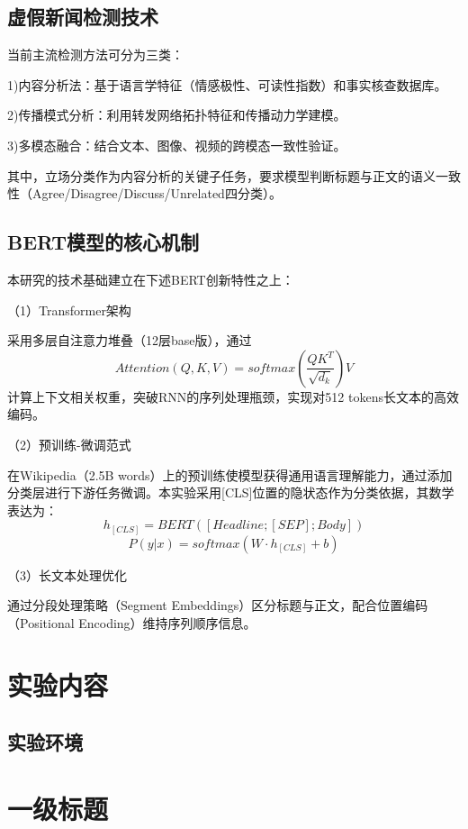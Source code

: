 \documentclass{cjc}
\begin{document}
\subsection{虚假新闻检测技术}

当前主流检测方法可分为三类：

1)内容分析法：基于语言学特征（情感极性、可读性指数）和事实核查数据库。

2)传播模式分析：利用转发网络拓扑特征和传播动力学建模。

3)多模态融合：结合文本、图像、视频的跨模态一致性验证。

其中，立场分类作为内容分析的关键子任务，要求模型判断标题与正文的语义一致性（Agree/Disagree/Discuss/Unrelated四分类）。

\subsection{BERT模型的核心机制}

本研究的技术基础建立在下述BERT创新特性之上：

（1）Transformer架构

采用多层自注意力堆叠（12层base版），通过
$$Attention(Q,K,V)=softmax(\frac{QK^T}{\sqrt{d_k}})V$$
计算上下文相关权重，突破RNN的序列处理瓶颈，实现对512 tokens长文本的高效编码。

（2）预训练-微调范式

在Wikipedia（2.5B words）上的预训练使模型获得通用语言理解能力，通过添加分类层进行下游任务微调。本实验采用[CLS]位置的隐状态作为分类依据，其数学表达为：
$$h_{[CLS]} = BERT([Headline; [SEP]; Body])$$
$$P(y|x) = softmax(W \cdot h_{[CLS]} + b)$$

（3）长文本处理优化

通过分段处理策略（Segment Embeddings）区分标题与正文，配合位置编码（Positional Encoding）维持序列顺序信息。

\section{实验内容}

\subsection{实验环境}



\section{一级标题}
\end{document}
